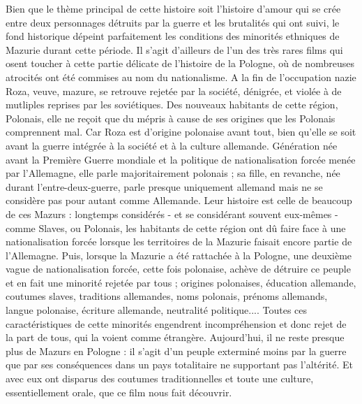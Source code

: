 \documentclass[12pt, twocolumn]{amsart}
\begin{document}
Bien que le thème principal de cette histoire soit l'histoire d'amour qui se crée entre deux personnages détruits par la guerre et les brutalités qui ont suivi, le fond historique dépeint parfaitement les conditions des minorités ethniques de Mazurie durant cette période. Il s'agit d'ailleurs de l'un des très rares films qui osent toucher à cette partie délicate de l'histoire de la Pologne, où de nombreuses atrocités ont été commises au nom du nationalisme. A la fin de l'occupation nazie Roza, veuve, mazure, se retrouve rejetée par la société, dénigrée, et violée à de mutliples reprises par les soviétiques. Des nouveaux habitants de cette région, Polonais, elle ne reçoit que du mépris à cause de ses origines que les Polonais comprennent mal. Car Roza est d'origine polonaise avant tout, bien qu'elle se soit avant la guerre intégrée à la société et à la culture allemande. Génération née avant la Première Guerre mondiale et la politique de nationalisation forcée menée par l'Allemagne, elle parle majoritairement polonais ; sa fille, en revanche, née durant l'entre-deux-guerre, parle presque uniquement allemand mais ne se considère pas pour autant comme Allemande. Leur histoire est celle de beaucoup de ces Mazurs : longtemps considérés - et se considérant souvent eux-mêmes - comme Slaves, ou Polonais, les habitants de cette région ont dû faire face à une nationalisation forcée lorsque les territoires de la Mazurie faisait encore partie de l'Allemagne. Puis, lorsque la Mazurie a été rattachée à la Pologne, une deuxième vague de nationalisation forcée, cette fois polonaise, achève de détruire ce peuple et en fait une minorité rejetée par tous ; origines polonaises, éducation allemande, coutumes slaves, traditions allemandes, noms polonais, prénoms allemands, langue polonaise, écriture allemande, neutralité politique.... Toutes ces caractéristiques de cette minorités engendrent incompréhension et donc rejet de la part de tous, qui la voient comme étrangère. Aujourd'hui, il ne reste presque plus de Mazurs en Pologne : il s'agit d'un peuple exterminé moins par la guerre que par ses conséquences dans un pays totalitaire ne supportant pas l'altérité. Et avec eux ont disparus des coutumes traditionnelles et toute une culture, essentiellement orale, que ce film nous fait découvrir.  
\clearpage
\end{document}
